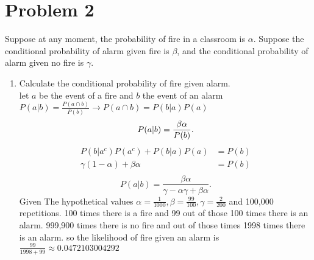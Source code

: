 \documentclass{article}
\begin{document}
    \section{Problem 2}
    Suppose at any moment, the probability of fire in a classroom is $\alpha$. Suppose the
conditional probability of alarm given fire is $\beta$, and the conditional probability of alarm given no
fire is $\gamma$.
    \begin{enumerate}
        \item Calculate the conditional probability of fire given alarm.
            \\ let $a$ be the event of a fire and $b$ the event of an alarm
            $P(a|b) = \frac{P(a \cap b)}{P(b)}  \rightarrow P(a \cap b) = P(b|a) P(a)$
            \[
            P(a|b) = \frac{\beta \alpha}{P(b)} \\
            .\] 
            \begin{align}
                P(b|a^{c})P(a^{c}) + P(b|a)P(a) &= P(b)  \\
                \gamma (1-\alpha ) + \beta \alpha &= P(b) \\
            \end{align}
            \[
            P(a|b) = \frac{\beta \alpha}{\gamma - \alpha \gamma + \beta \alpha}
            .\] 
            Given The hypothetical values $\alpha = \frac{1}{1000}, \beta = \frac{99}{100}, \gamma = \frac{2}{200}$ and 100,000 repetitions.
            100 times there is a fire and 99 out of those 100 times there is an alarm.
            999,900 times there is no fire and out of those times 1998 times there is an alarm.
            so the likelihood of fire given an alarm is $\frac{99}{1998+99} \approx 0.0472103004292$

    \end{enumerate}
        
\end{document}
